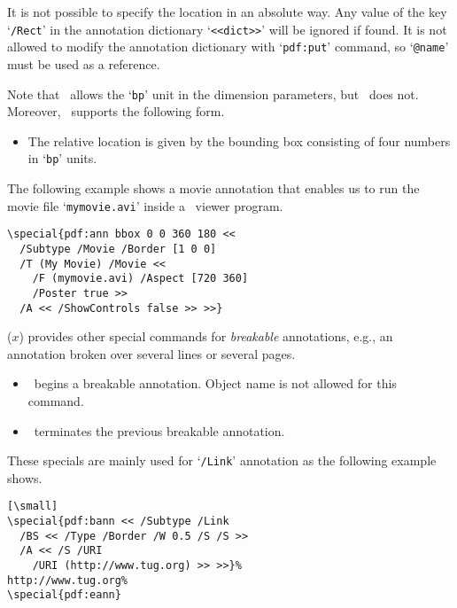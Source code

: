 \documentclass[final]{ltugboat}
\def\DPM{\acro{DVI\-PDFM}}
\def\DPMx{\acro{DVI\-PDFM}($x$)}
\let\DPX\DVIPDFMx
\def\fafter{1.5pt}
\begin{document}
\noindent
It is not possible to specify the location in an absolute way.
Any value of the key `\texttt{/Rect}' in the annotation dictionary `\texttt{<<dict>>}' will be ignored if found.
It is not allowed to modify the annotation dictionary with `\texttt{pdf:put}' command, so `\texttt{@name}' must be used as a reference.

Note that \DPX\ allows the `\texttt{bp}' unit in the dimension parameters, but \DPM\ does not.
Moreover, \DPX\ supports the following form.

\begin{itemize}
\item{}
\par\vspace{\fafter}\noindent
The relative location is given by the bounding box consisting of four numbers in `\texttt{bp}' units.
\end{itemize}

\noindent
The following example shows a movie annotation that enables us to run the movie file `\texttt{mymovie.avi}' inside a \PDF\ viewer program.

\begin{verbatim}
\special{pdf:ann bbox 0 0 360 180 <<
  /Subtype /Movie /Border [1 0 0]
  /T (My Movie) /Movie <<
    /F (mymovie.avi) /Aspect [720 360]
    /Poster true >>
  /A << /ShowControls false >> >>}
\end{verbatim}

\DPMx{} provides other special commands for \emph{breakable} annotations, e.g., an annotation broken over several lines or several pages.

\begin{itemize}
\item{} \ begins a breakable annotation.
Object name is not allowed for this command.
\item{} \ terminates the previous breakable annotation.
\end{itemize}

\noindent
These specials are mainly used for `\texttt{/Link}' annotation as the following example shows.

\begin{verbatim}[\small]
\special{pdf:bann << /Subtype /Link
  /BS << /Type /Border /W 0.5 /S /S >>
  /A << /S /URI
    /URI (http://www.tug.org) >> >>}%
http://www.tug.org%
\special{pdf:eann}
\end{verbatim}
\end{document}
